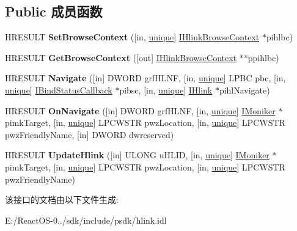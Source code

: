 \subsection*{Public 成员函数}
\begin{DoxyCompactItemize}
\item 
\mbox{\label{interface_i_hlink_frame_aa544a7170c5cdac5ea946e7edf0f8830}} 
H\+R\+E\+S\+U\+LT {\bfseries Set\+Browse\+Context} (\mbox{[}in, \hyperlink{interfaceunique}{unique}\mbox{]} \hyperlink{interface_i_hlink_browse_context}{I\+Hlink\+Browse\+Context} $\ast$pihlbc)
\item 
\mbox{\label{interface_i_hlink_frame_a660c7145f5ba89134301ff992ba87e31}} 
H\+R\+E\+S\+U\+LT {\bfseries Get\+Browse\+Context} (\mbox{[}out\mbox{]} \hyperlink{interface_i_hlink_browse_context}{I\+Hlink\+Browse\+Context} $\ast$$\ast$ppihlbc)
\item 
\mbox{\label{interface_i_hlink_frame_a72b4f9c779b3a2692d8738a5fd25d1a3}} 
H\+R\+E\+S\+U\+LT {\bfseries Navigate} (\mbox{[}in\mbox{]} D\+W\+O\+RD grf\+H\+L\+NF, \mbox{[}in, \hyperlink{interfaceunique}{unique}\mbox{]} L\+P\+BC pbc, \mbox{[}in, \hyperlink{interfaceunique}{unique}\mbox{]} \hyperlink{interface_i_bind_status_callback}{I\+Bind\+Status\+Callback} $\ast$pibsc, \mbox{[}in, \hyperlink{interfaceunique}{unique}\mbox{]} \hyperlink{interface_i_hlink}{I\+Hlink} $\ast$pihl\+Navigate)
\item 
\mbox{\label{interface_i_hlink_frame_a1aceda163a8c9fab40adb2dee0864e40}} 
H\+R\+E\+S\+U\+LT {\bfseries On\+Navigate} (\mbox{[}in\mbox{]} D\+W\+O\+RD grf\+H\+L\+NF, \mbox{[}in, \hyperlink{interfaceunique}{unique}\mbox{]} \hyperlink{interface_i_moniker}{I\+Moniker} $\ast$pimk\+Target, \mbox{[}in, \hyperlink{interfaceunique}{unique}\mbox{]} L\+P\+C\+W\+S\+TR pwz\+Location, \mbox{[}in, \hyperlink{interfaceunique}{unique}\mbox{]} L\+P\+C\+W\+S\+TR pwz\+Friendly\+Name, \mbox{[}in\mbox{]} D\+W\+O\+RD dwreserved)
\item 
\mbox{\label{interface_i_hlink_frame_a5a74621b78ab6195fb43e525eac7d8fe}} 
H\+R\+E\+S\+U\+LT {\bfseries Update\+Hlink} (\mbox{[}in\mbox{]} U\+L\+O\+NG u\+H\+L\+ID, \mbox{[}in, \hyperlink{interfaceunique}{unique}\mbox{]} \hyperlink{interface_i_moniker}{I\+Moniker} $\ast$pimk\+Target, \mbox{[}in, \hyperlink{interfaceunique}{unique}\mbox{]} L\+P\+C\+W\+S\+TR pwz\+Location, \mbox{[}in, \hyperlink{interfaceunique}{unique}\mbox{]} L\+P\+C\+W\+S\+TR pwz\+Friendly\+Name)
\end{DoxyCompactItemize}


该接口的文档由以下文件生成\+:\begin{DoxyCompactItemize}
\item 
E\+:/\+React\+O\+S-\/0../sdk/include/psdk/hlink.\+idl\end{DoxyCompactItemize}
